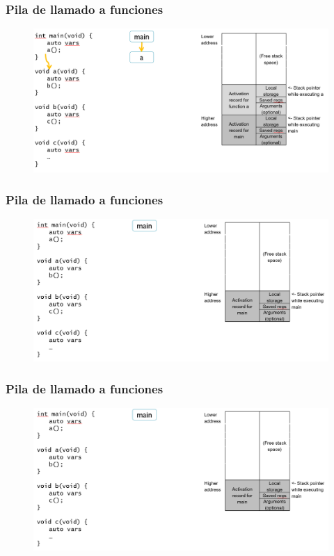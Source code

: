 \documentclass[10.5pt,scale=1.0,t,aspectratio=169,hyperref={pdfpagelabels=false}]{beamer}
\begin{document}
\begin{frame}
	\frametitle{Pila de llamado a funciones}
	\begin{figure}
		\centering
		\includegraphics[scale=0.4]{StackFunction6}
	\end{figure}
\end{frame}
\begin{frame}
	\frametitle{Pila de llamado a funciones}
	\begin{figure}
		\centering
		\includegraphics[scale=0.4]{StackFunction7}
	\end{figure}
\end{frame}
\begin{frame}
	\frametitle{Pila de llamado a funciones}
	\begin{figure}
		\centering
		\includegraphics[scale=0.4]{StackFunction7}
	\end{figure}
\end{frame}
\end{document}
